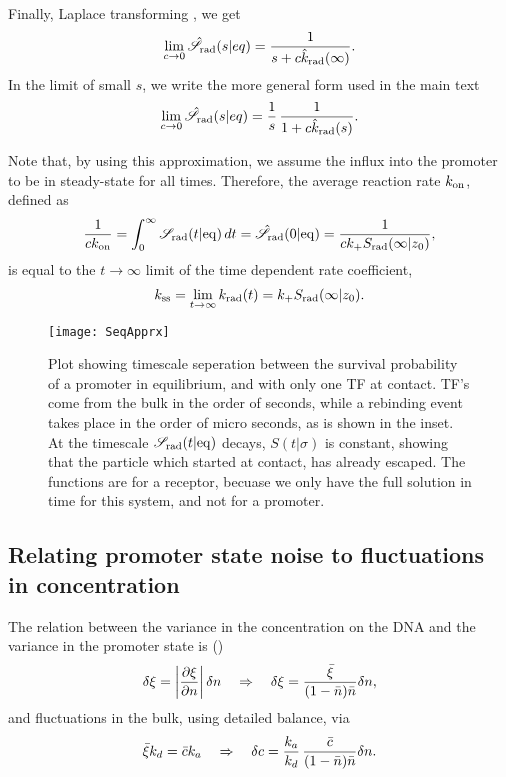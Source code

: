 Finally, Laplace transforming , we get
\begin{equation}
 \lim_{c \to 0} \hat{\mathscr{S}}_{\rm rad}(s|eq) = \frac{1}{s + c \hat{k}_{\rm rad}(\infty)}.
\end{equation}
In the limit of small $s$, we write the more general form used in the main text
\begin{equation}
 \lim_{c \to 0} \hat{\mathscr{S}}_{\rm rad}(s|eq) = \frac{1}{s} \, \frac{1}{1 + c \hat{k}_{\rm rad}(s)}.
\end{equation}

Note that, by using this approximation, we assume the influx into the promoter to be in steady-state for all times. Therefore, the average reaction rate $k_{\rm on}$, defined as
\begin{equation}
 \frac{1}{c k_{\rm on}} = \int_0^\infty \mathscr{S}_{\rm rad}(t|{\rm eq}) \, dt = \hat{\mathscr{S}}_{\rm rad}(0|{\rm eq}) = \frac{1}{c k_+ S_{\rm rad}(\infty|z_0)},
\end{equation}
is equal to the $t\to\infty$ limit of the time dependent rate coefficient, 
\begin{equation}
 k_{\rm ss} = \lim_{t \to \infty} k_{\rm rad}(t) = k_+ S_{\rm rad}(\infty|z_0).
\end{equation}

\begin{figure}[hb!]
\centering
\texttt{[image: SeqApprx]}
\caption{ Plot showing timescale seperation between the survival probability of a promoter in equilibrium, and with only one TF at contact. TF's come from the bulk in the order of seconds, while a rebinding event takes place in the order of micro seconds, as is shown in the inset. At the timescale $\mathscr{S}_{\rm rad}(t|{\rm eq})$ decays, $S(t|\sigma)$ is constant, showing that the particle which started at contact, has already escaped. The functions are for a receptor, becuase we only have the full solution in time for this system, and not for a promoter.}
\end{figure}

\subsection{ Relating promoter state noise to fluctuations in concentration}
The relation between the variance in the concentration on the DNA and the variance in the promoter state is ()
\begin{equation}
 \delta \xi = \left|\frac{\partial \xi}{\partial n}\right| \delta n \quad \Rightarrow \quad  \delta \xi = \frac{\bar{\xi}}{(1-\bar{n})\bar{n}}\delta n,
 \elabel{EqxiNoise}
\end{equation}
and fluctuations in the bulk, using detailed balance, via
\begin{equation}
 \bar{\xi} k_d = \bar{c} k_a \quad \Rightarrow \quad \delta c = \frac{k_a}{k_d} \, \frac{\bar{c}}{(1-\bar{n})\bar{n}}\delta n.
 \elabel{EqcNoise}
\end{equation}

